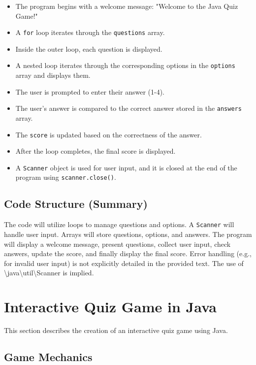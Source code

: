 \documentclass{article}
\begin{document}
\begin{itemize}
    \item The program begins with a welcome message:  "Welcome to the Java Quiz Game!"
    \item A \texttt{for} loop iterates through the \texttt{questions} array.
    \item Inside the outer loop, each question is displayed.
    \item A nested loop iterates through the corresponding options in the \texttt{options} array and displays them.
    \item The user is prompted to enter their answer (1-4).
    \item The user's answer is compared to the correct answer stored in the \texttt{answers} array.
    \item The \texttt{score} is updated based on the correctness of the answer.
    \item After the loop completes, the final score is displayed.
    \item A \texttt{Scanner} object is used for user input, and it is closed at the end of the program using \texttt{scanner.close()}.
\end{itemize}

\subsection{Code Structure (Summary)}

The code will utilize loops to manage questions and options.  A \texttt{Scanner} will handle user input.  Arrays will store questions, options, and answers.  The program will display a welcome message, present questions, collect user input, check answers, update the score, and finally display the final score.  Error handling (e.g., for invalid user input) is not explicitly detailed in the provided text.  The use of \textbackslash{}java\textbackslash{}util\textbackslash{}Scanner is implied.


\section{Interactive Quiz Game in Java}

This section describes the creation of an interactive quiz game using Java.

\subsection{Game Mechanics}
\end{document}
